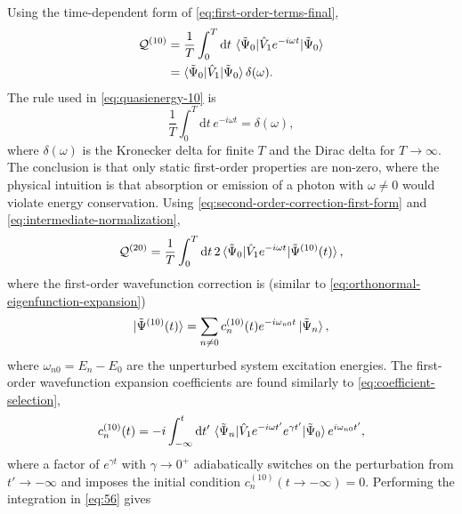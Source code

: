 \documentclass[%
class = book,%
crop = false,%
float = true,%
multi = true,%
preview = false,%
]{standalone}
\begin{document}
Using the time-dependent form of \eqref{eq:first-order-terms-final},
\begin{equation}
  \label{eq:quasienergy-10}
  \begin{aligned}
    \mathcal{Q}^{(10)} &= \frac{1}{T} \int_{0}^{T} \mathrm{d}t \, \braket{\tilde{\Psi}_{0}|\hat{V}_{1}e^{-i\omega t}|\tilde{\Psi}_{0}} \\
    &= \braket{\tilde{\Psi}_{0}|\hat{V}_{1}|\tilde{\Psi}_{0}} \delta(\omega).
\end{aligned}
\end{equation}
The rule used in \eqref{eq:quasienergy-10} is
\begin{equation}
  \label{eq:kronecker-delta-frequencies}
  \frac{1}{T} \int_{0}^{T} \mathrm{d}t \, e^{-i\omega t} = \delta(\omega),
\end{equation}
where \(\delta(\omega)\) is the Kronecker delta for finite \(T\) and the Dirac delta for \(T \rightarrow \infty\). The conclusion is that only static first-order properties are non-zero, where the physical intuition is that absorption or emission of a photon with \(\omega \neq 0\) would violate energy conservation. Using \eqref{eq:second-order-correction-first-form} and \eqref{eq:intermediate-normalization},
\begin{equation}
  \label{eq:quasienergy-20}
  \mathcal{Q}^{(20)} = \frac{1}{T} \int_{0}^{T} \mathrm{d}t \, 2\braket{\tilde{\Psi}_{0}|\hat{V}_{1}e^{-i\omega t}|\tilde{\Psi}^{(10)}(t)},
\end{equation}
where the first-order wavefunction correction is (similar to \eqref{eq:orthonormal-eigenfunction-expansion})
\begin{equation}
  \label{eq:first-order-wavefunction}
  \ket{\tilde{\Psi}^{(10)}(t)} = \sum_{n\neq 0} c_{n}^{(10)}(t) e^{-i\omega_{n0}t} \ket{\tilde{\Psi}_{n}},
\end{equation}
where \(\omega_{n0} = E_{n} - E_{0}\) are the unperturbed system excitation energies. The first-order wavefunction expansion coefficients are found similarly to \eqref{eq:coefficient-selection},
\begin{equation}
  \label{eq:56}
  c_{n}^{(10)}(t) = -i \int_{-\infty}^{t} \mathrm{d}t' \, \braket{\tilde{\Psi}_{n}|\hat{V}_{1}e^{-i\omega t'}e^{\gamma t'}|\tilde{\Psi}_{0}}e^{i\omega_{n0}t'},
\end{equation}
where a factor of \(e^{\gamma t}\) with \(\gamma \rightarrow 0^{+}\) adiabatically switches on the perturbation from \(t' \rightarrow -\infty\) and imposes the initial condition \(c_{n}^{(10)}(t \rightarrow -\infty) = 0\). Performing the integration in \eqref{eq:56} gives
\end{document}
